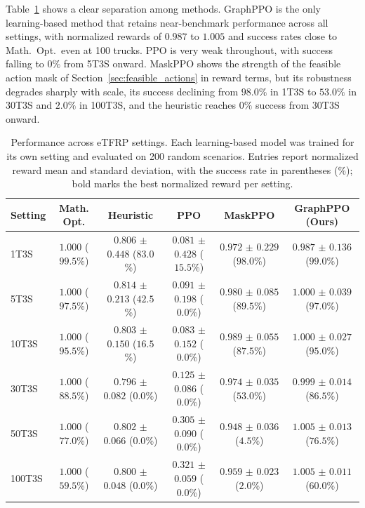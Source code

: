 \documentclass[journal]{IEEEtran}
\begin{document}
Table~\ref{tab:genresults} shows a clear separation among methods. GraphPPO is the only learning-based method that retains near-benchmark performance across all settings, with normalized rewards of $0.987$ to $1.005$ and success rates close to Math.\ Opt.\ even at 100 trucks. PPO is very weak throughout, with success falling to $0\%$ from 5T3S onward. MaskPPO shows the strength of the feasible action mask of Section~\ref{sec:feasible_actions} in reward terms, but its robustness degrades sharply with scale, its success declining from $98.0\%$ in 1T3S to $53.0\%$ in 30T3S and $2.0\%$ in 100T3S, and the heuristic reaches $0\%$ success from 30T3S onward.

\label{sec:general-results}
\begin{table}[t]
\centering
\small
\caption{Performance across eTFRP settings. Each learning-based model was trained for its own setting and evaluated on 200 random scenarios. Entries report normalized reward mean and standard deviation, with the success rate in parentheses (\%); bold marks the best normalized reward per setting.}
\begin{tabular}{@{}lccccc@{}}
\toprule
Setting & Math. Opt. & Heuristic & PPO & MaskPPO & GraphPPO (Ours) \\
\midrule
1T3S & $\mathbf{1.000}$ ($99.5$\%) & $0.806$ $\pm$ $0.448$ ($83.0$\%) & $0.081$ $\pm$ $0.428$ ($15.5$\%) & $0.972$ $\pm$ $0.229$ ($98.0$\%) & $0.987$ $\pm$ $0.136$ ($99.0$\%) \\
5T3S & $\mathbf{1.000}$ ($97.5$\%) & $0.814$ $\pm$ $0.213$ ($42.5$\%) & $0.091$ $\pm$ $0.198$ ($0.0$\%) & $0.980$ $\pm$ $0.085$ ($89.5$\%) & $\mathbf{1.000}$ $\pm$ $0.039$ ($97.0$\%) \\
10T3S & $\mathbf{1.000}$ ($95.5$\%) & $0.803$ $\pm$ $0.150$ ($16.5$\%) & $0.083$ $\pm$ $0.152$ ($0.0$\%) & $0.989$ $\pm$ $0.055$ ($87.5$\%) & $\mathbf{1.000}$ $\pm$ $0.027$ ($95.0$\%) \\
30T3S & $\mathbf{1.000}$ ($88.5$\%) & $0.796$ $\pm$ $0.082$ ($0.0$\%) & $0.125$ $\pm$ $0.086$ ($0.0$\%) & $0.974$ $\pm$ $0.035$ ($53.0$\%) & $0.999$ $\pm$ $0.014$ ($86.5$\%) \\
50T3S & $1.000$ ($77.0$\%) & $0.802$ $\pm$ $0.066$ ($0.0$\%) & $0.305$ $\pm$ $0.090$ ($0.0$\%) & $0.948$ $\pm$ $0.036$ ($4.5$\%) & $\mathbf{1.005}$ $\pm$ $0.013$ ($76.5$\%) \\
100T3S & $1.000$ ($59.5$\%) & $0.800$ $\pm$ $0.048$ ($0.0$\%) & $0.321$ $\pm$ $0.059$ ($0.0$\%) & $0.959$ $\pm$ $0.023$ ($2.0$\%) & $\mathbf{1.005}$ $\pm$ $0.011$ ($60.0$\%) \\
\bottomrule
\end{tabular}
\label{tab:genresults}
\end{table}
\end{document}
